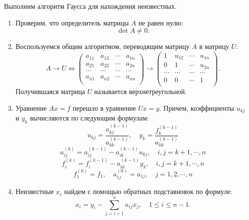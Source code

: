 Выполним алгоритм Гаусса для нахождения неизвестных.
\begin{enumerate}
    \item Проверим, что определитель матрицы $A$ не равен нулю:
    \begin{equation}
        \det A \neq 0.
    \end{equation}
    \item Воспользуемся общим алгоритмом, переводящим матрицу $A$ в матрицу $U$:
    \begin{equation}
        A \longrightarrow U \Longleftrightarrow 
        \begin{pmatrix}
        a_{11} & a_{12} & \dotsb & a_{1n} \\
        a_{21} & a_{22} & \dotsb & a_{2n} \\
        \dotsb & \dotsb & \dotsb & \dotsb \\
        a_{n1} & a_{n2} & \dotsb & a_{nn} \\
        \end{pmatrix}
        \longrightarrow
        \begin{pmatrix}
        1 & u_{12} & \dotsb & u_{1n} \\
        0 & 1 & \dotsb & u_{2n} \\
        \dotsb & \dotsb & \dotsb & \dotsb \\
        0 & 0 & \dotsb & 1 \\
        \end{pmatrix}.
    \end{equation}
    Получившаяся матрица $U$ называется верхнетреугольной.
    \item Уравнение $Ax = f$ перешло в уравнение $Ux = y$. Причем, коэффициенты $u_{kj}$ и $y_k$ вычисляются по следующим формулам:
    \begin{equation}
        u_{kj} = \frac{a_{kj}^{(k-1)}}{a_{kk}^{(k-1)}}, \quad 
        y_{k} = \frac{f_{k}^{(k-1)}}{a_{kk}^{(k-1)}}
    \end{equation}
    \begin{equation}
        a_{ij}^{(k)} = a_{ij}^{(k-1)} - a_{ik}^{(k-1)}u_{kj}, \quad i,j = k+1, \dotsb, n
    \end{equation}
    \begin{equation}
        f_{i}^{(k)} = f_{i}^{(k-1)} - a_{ik}^{(k-1)}y_{k}, \quad i,j = k+1, \dotsb, n
    \end{equation}
    \begin{equation}
        f_1^{(0)} = f_1, \quad a_{1j}^{(0)} = a_{1j}, \quad j = 1, 2, \dotsb, n
    \end{equation}
    \item Неизвестные $x_i$ найдем с помощью обратных подставновок по формуле:
    \begin{equation}
        x_i = y_i - \sum_{j = i + 1}^{n} u_{ij}x_j, \quad 1 \leq i \leq n-1.
    \end{equation}
\end{enumerate}


